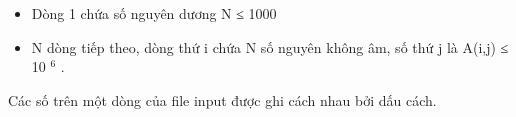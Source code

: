 \begin{itemize}
	\item     Dòng 1 chứa số nguyên dương N ≤ 1000   
	\item     N dòng tiếp theo, dòng thứ i chứa N số nguyên không âm, số thứ j là A(i,j)         ≤ 10     $^      6     $     .    
\end{itemize}

   Các số trên một dòng của file input được ghi cách nhau bởi dấu cách.